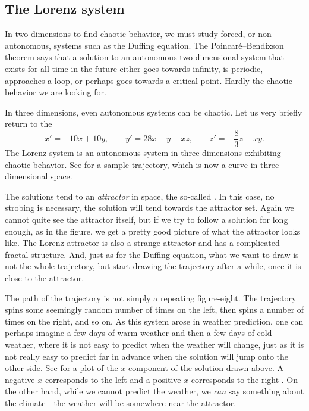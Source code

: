 \subsection{The Lorenz system}

In two dimensions to find chaotic behavior,
we must study forced, or non-autonomous, systems such as the Duffing
equation.
The Poincar\'e--Bendixson theorem says that
a solution to an autonomous
two-dimensional system that exists for all time in the future
either goes towards infinity, is periodic, approaches a loop,
or perhaps goes towards a critical point.
Hardly the chaotic
behavior we are looking for.

In three dimensions, even autonomous systems can be chaotic.
Let us very briefly return to the 
\begin{equation*}
x' = -10x +10y, \qquad y' = 28x-y-xz, \qquad z'=-\frac{8}{3}z + xy .
\end{equation*}
The Lorenz system is an autonomous system in three dimensions
exhibiting chaotic behavior.
See  for a sample trajectory,
which is now a curve in three-dimensional space.
\begin{myfig}
\capstart
{}
\caption{A trajectory in the Lorenz system. \label{nlin:lorenz}}
\end{myfig}

The solutions tend to an \emph{attractor} in space,
the so-called \emph{}.
In this case, no strobing is
necessary, the solution will tend towards the attractor set.
Again we cannot quite see the attractor itself, but if we try to follow a solution
for long enough, as in the figure,
we get a pretty good picture of what the attractor looks
like.
The Lorenz attractor is also a strange attractor and has a complicated
fractal structure.  And, just as for the Duffing equation, what we want to
draw is not the whole trajectory, but start drawing the trajectory after a
while, once it is close to the attractor.

The path of the trajectory is not simply a repeating figure-eight.
The trajectory spins some
seemingly random number of times on the left, then spins a number of times on
the right, and so on.  As this system arose in weather prediction, one can
perhaps imagine a few days of warm weather and then a few days of cold
weather, where it is not easy to predict when the weather will change,
just as it is not really easy to predict far in advance when the solution
will jump onto the other side.
See  for a
plot of the $x$ component of the solution drawn above.  A negative $x$
corresponds to the left  and a positive $x$
corresponds to the right .
On the other hand, while we cannot predict the weather,
we \emph{can} say something about
the climate---the weather will be somewhere near the attractor.


